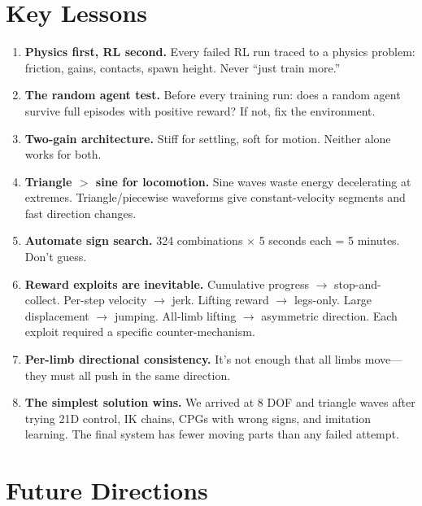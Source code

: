 \documentclass[11pt, a4paper]{article}
\begin{document}
\section{Key Lessons}

\begin{enumerate}
\item \textbf{Physics first, RL second.} Every failed RL run traced to a physics problem: friction, gains, contacts, spawn height. Never ``just train more.''

\item \textbf{The random agent test.} Before every training run: does a random agent survive full episodes with positive reward? If not, fix the environment.

\item \textbf{Two-gain architecture.} Stiff for settling, soft for motion. Neither alone works for both.

\item \textbf{Triangle $>$ sine for locomotion.} Sine waves waste energy decelerating at extremes. Triangle/piecewise waveforms give constant-velocity segments and fast direction changes.

\item \textbf{Automate sign search.} 324 combinations $\times$ 5 seconds each = 5 minutes. Don't guess.

\item \textbf{Reward exploits are inevitable.} Cumulative progress $\rightarrow$ stop-and-collect. Per-step velocity $\rightarrow$ jerk. Lifting reward $\rightarrow$ legs-only. Large displacement $\rightarrow$ jumping. All-limb lifting $\rightarrow$ asymmetric direction. Each exploit required a specific counter-mechanism.

\item \textbf{Per-limb directional consistency.} It's not enough that all limbs move---they must all push in the same direction.

\item \textbf{The simplest solution wins.} We arrived at 8 DOF and triangle waves after trying 21D control, IK chains, CPGs with wrong signs, and imitation learning. The final system has fewer moving parts than any failed attempt.
\end{enumerate}

\section{Future Directions}
\end{document}
